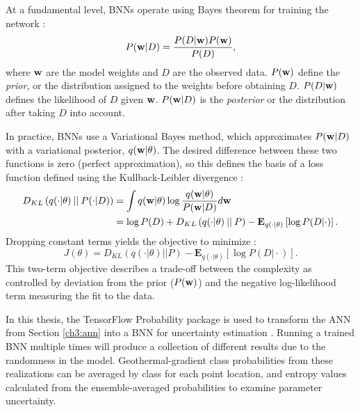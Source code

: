 At a fundamental level, BNNs operate using Bayes theorem for training the network \citep{webster_probabilistic_2021}:
\begin{equation}
    \label{eq:bayesrule}
    P({\bf w} \vert D) = \frac{P(D \vert {\bf w}) P({\bf w})}{P(D)},
\end{equation}
where ${\bf w}$ are the model weights and $D$ are the observed data. $P({\bf w})$ define the \textit{prior}, or the distribution assigned to the weights before obtaining $D$. $P(D \vert {\bf w})$ defines the likelihood of $D$ given ${\bf w}$. $P({\bf w} \vert D)$ is the \textit{posterior} or the distribution after taking $D$ into account.

In practice, BNNs use a Variational Bayes method, which approximates $P({\bf w} \vert D)$ with a variational posterior, $q({\bf w} \vert \theta)$. The desired difference between these two functions is zero (perfect approximation), so this defines the basis of a loss function defined using the Kullback-Leibler divergence \citep{webster_probabilistic_2021}:
\begin{equation}
    \label{eq:bnn_loss}
    \begin{aligned}
    D_{KL}\left(q(\cdot \vert \theta)\mathbin{\vert\vert} P(\cdot \vert D)\right) &= \int{q({\bf w} \vert \theta) \log\frac{q({\bf w} \vert \theta)}{P({\bf w} \vert D)}d{\bf w}} \\
    &= \log P(D) + D_{KL}\left(q(\cdot \vert \theta)\mathbin{\vert\vert}P\right)%
    - \mathbf{E}_{q(\cdot \vert \theta)}\left[\log P(D \vert \cdot)\right].
    \end{aligned}
\end{equation}
Dropping constant terms yields the objective to minimize \citep{blundell_weight_2015}:
\begin{equation}
    \label{eq:bnn_objective}
    J(\theta) = D_{KL}\left(q(\cdot \vert \theta)\mathbin{\vert\vert}P\right) - \mathbf{E}_{q(\cdot\vert \theta)}\left[\log P(D \vert\cdot)\right].
\end{equation}
This two-term objective describes a trade-off between the complexity as controlled by deviation from the prior ($P({\bf w})$) and the negative log-likelihood term measuring the fit to the data.

In this thesis, the TensorFlow Probability package is used to transform the ANN from Section \ref{ch3:ann} into a BNN for uncertainty estimation \citep{dillon_tensorflow_2017}. Running a trained BNN multiple times will produce a collection of different results due to the randomness in the model. Geothermal-gradient class probabilities from these realizations can be averaged by class for each point location, and entropy values calculated from the ensemble-averaged probabilities to examine parameter uncertainty.

